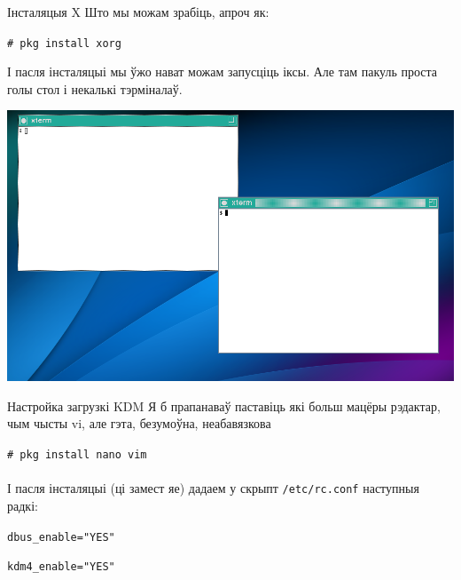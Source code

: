 \documentclass[ignorenonframetext,hyperref={pdftex,unicode}]{beamer}
\begin{document}
\begin{frame}{Інсталяцыя X} %
	Што мы можам зрабіць, апроч як:

	\texttt{\# pkg install xorg}
	
	І пасля інсталяцыі мы ўжо нават можам запусціць іксы. Але там пакуль проста голы стол і некалькі тэрміналаў.
	\begin{center}
 		\includegraphics[height=0.6\textheight,keepaspectratio]{TWM} %
	\end{center}
\end{frame} %

\begin{frame}{Настройка загрузкі KDM} %
	Я б прапанаваў паставіць які больш мацёры рэдактар, чым чысты vi, але гэта, безумоўна, неабавязкова

	\texttt{\# pkg install nano vim}
	\\~\\	
	І пасля інсталяцыі (ці замест яе) дадаем у скрыпт \texttt{/etc/rc.conf} наступныя радкі:

	\texttt{dbus\_enable="YES"}
	
	\texttt{kdm4\_enable="YES"}
\end{frame} %
\end{document}
